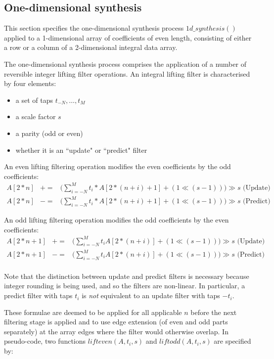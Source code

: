 \subsection{One-dimensional synthesis}
\label{onedsynth}

This section specifies the one-dimensional synthesis process
$1d\_synthesis()$ applied to a 1-dimensional array of coefficients of
even length, consisting
of either a row or a column of a 2-dimensional integral data array.

The one-dimensional synthesis process comprises the application of a
number of reversible integer lifting filter operations. An integral lifting filter
 is characterised by four elements:
\begin{itemize}
\item a set of taps $t_{-N}, \hdots,t_M$
\item a scale factor $s$
\item a parity (odd or even)
\item whether it is an ``update" or ``predict" filter
\end{itemize}

An even lifting filtering operation modifies the even coefficients
by the odd coefficients:
\begin{eqnarray*}
  A[2*n]& +=& \big( \sum^M_{i=-N} t_i *A[2*(n+i) + 1] +(1\ll (s-1))\big) \gg s \mbox{ (Update)} \\
  A[2*n]& -=& \big( \sum^M_{i=-N} t_i *A[2*(n+i) + 1] +(1\ll (s-1))\big) \gg s \mbox{ (Predict)}
\end{eqnarray*}

An odd lifting filtering operation modifies the odd coefficients
 by the even coefficients:
\begin{eqnarray*}
  A[2*n+1]& +=&  \big( \sum^M_{i=-N} t_i A[2*(n+i)]+(1\ll (s-1)) \big) \gg s \mbox{ (Update)} \\
  A[2*n+1]& -=&  \big( \sum^M_{i=-N} t_i A[2*(n+i)] +(1\ll (s-1))\big) \gg s \mbox{ (Predict)} \\
\end{eqnarray*}

\begin{informative}
Note that the distinction between update and predict filters is necessary
because integer rounding is being used, and so the filters are non-linear.
In particular, a predict filter with taps $t_i$ is {\em not} equivalent to 
an update filter with taps $-t_i$.
\end{informative}

These formulae are deemed to be applied for all applicable $n$
before the next filtering stage is applied and to use edge extension (of even and
odd parts separately) at the array
edges where the filter would otherwise overlap. In pseudo-code, two
functions $lifteven(A, t_i, s)$ and $liftodd(A, t_i, s)$ are specified by:

